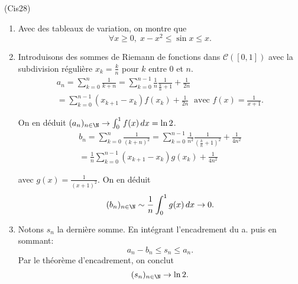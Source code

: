 \begin{tiny}(Cis28)\end{tiny}
\begin{enumerate}
  \item Avec des tableaux de variation, on montre que
\[
  \forall x\geq 0, \; x - x^2 \leq \sin x \leq x.
\]

  \item Introduisons des sommes de Riemann de fonctions dans $\mathcal{C}(\left[ 0,1 \right])$ avec la subdivision régulière $x_k = \frac{k}{n}$ pour $k$ entre $0$ et $n$.
\begin{multline*}
 a_n = \sum_{k=0}^{n} \frac{1}{k + n} = \sum_{k=0}^{n-1} \frac{1}{n}\frac{1}{\frac{k}{n} + 1} + \frac{1}{2n}\\
  = \sum_{k=0}^{n-1}(x_{k+1} - x_k)f(x_k) + \frac{1}{2n}\;
\text{ avec } f(x) = \frac{1}{x+1}. 
\end{multline*}

On en déduit $(a_n)_{n\in \N} \rightarrow \int_0^1 f(x)\,dx = \ln 2$.
\begin{multline*}
 b_n = \sum_{k=0}^{n} \frac{1}{(k + n)^2} = \sum_{k=0}^{n-1} \frac{1}{n^2}\frac{1}{(\frac{k}{n} + 1)^2} + \frac{1}{4n^2}\\
  = \frac{1}{n}\sum_{k=0}^{n-1}(x_{k+1} - x_k)g(x_k) + \frac{1}{4n^2}
\end{multline*}

avec $g(x) = \frac{1}{(x+1)^2}$. On en déduit 
\[
(b_n)_{n\in \N}\sim \frac{1}{n} \int_0^1 g(x)\,dx \rightarrow 0.  
\]

  \item Notons $s_n$ la dernière somme. En intégrant l'encadrement du a. puis en sommant:
\[
  a_n - b_n \leq s_n \leq a_n.
\]
Par le théorème d'encadrement, on conclut
\[
  (s_n)_{n \in \N} \rightarrow \ln 2.
\]

\end{enumerate}
